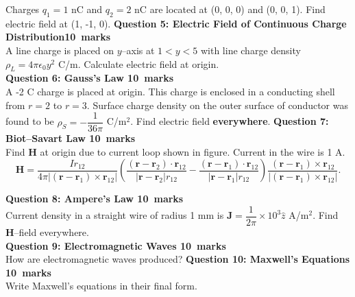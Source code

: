 \documentclass[12pt,a4paper]{article}
\def\Qfive{10}
\def\Qsix{10}
\def\Qseven{10}
\def\Qeight{10}
\def\Qnine{10}
\def\Qten{10}
\begin{document}
Charges $q_1=1$ nC and $q_2=2$ nC are located at (0, 0, 0) and (0, 0, 1). Find electric field at (1, -1, 0).
\newpage
\noindent\textbf{Question 5: Electric Field of Continuous Charge Distribution\hfill \Qfive~marks}\\
A line charge is placed on $y$--axis at $1<y<5$ with line charge density $\rho_L=4\pi\epsilon_0y^2$ C/m. Calculate electric field at origin.\\
\newpage
\noindent\textbf{Question 6: Gauss's Law \hfill \Qsix~marks}\\
A -2 C charge is placed at origin. This charge is enclosed in a conducting shell from $r=2$ to $r=3$. Surface charge density on the outer surface of conductor was found to be $\rho_S=-\dfrac{1}{36\pi}$ C/m$^2$. Find electric field \textbf{everywhere}.
\newpage
\noindent\textbf{Question 7: Biot--Savart Law \hfill \Qseven~marks}\\
Find \textbf{H} at origin due to current loop shown in figure. Current in the wire is 1 A.
\begin{equation*}
\textbf{H}=\dfrac{Ir_{12}}{4\pi|(\textbf{r}-\textbf{r}_1)\times\textbf{r}_{12}|}\left(\dfrac{(\textbf{r}-\textbf{r}_2)\cdot\textbf{r}_{12}}{|\textbf{r}-\textbf{r}_2|r_{12}}-\dfrac{(\textbf{r}-\textbf{r}_1)\cdot\textbf{r}_{12}}{|\textbf{r}-\textbf{r}_1|r_{12}}\right)\dfrac{(\textbf{r}-\textbf{r}_1)\times\textbf{r}_{12}}{|(\textbf{r}-\textbf{r}_1)\times \textbf{r}_{12}|}.
\end{equation*}
\begin{figure}[H]
\flushright
{}
\end{figure}
\newpage
\noindent\textbf{Question 8: Ampere's Law \hfill \Qeight~marks}\\
Current density in a straight wire of radius 1 mm is $\textbf{J}=\dfrac{1}{2\pi}\times 10^3\hat z$ A/m$^2$. Find \textbf{H}--field everywhere.\\
\newpage
\noindent\textbf{Question 9: Electromagnetic Waves \hfill \Qnine~marks}\\
How are electromagnetic waves produced?
\newpage
\noindent\textbf{Question 10: Maxwell's Equations \hfill \Qten~marks}\\
Write Maxwell's equations in their final form.
\end{document}
